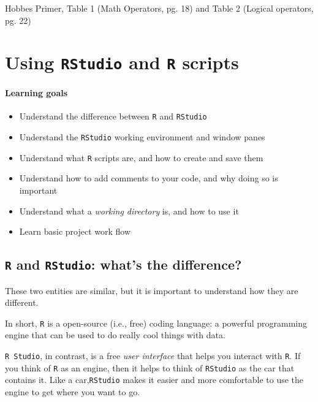 \documentclass[
]{book}
\providecommand{\tightlist}{%
  \setlength{\itemsep}{0pt}\setlength{\parskip}{0pt}}
\begin{document}
Hobbes Primer, Table 1 (Math Operators, pg. 18) and Table 2 (Logical operators, pg. 22)

\hypertarget{using-rstudio-and-r-scripts}{%
\chapter{\texorpdfstring{Using \texttt{RStudio} and \texttt{R} scripts}{Using RStudio and R scripts}}\label{using-rstudio-and-r-scripts}}

\hypertarget{learning-goals-1}{%
\subsubsection*{Learning goals}\label{learning-goals-1}}

\begin{itemize}
\tightlist
\item
  Understand the difference between \texttt{R} and \texttt{RStudio}
\item
  Understand the \texttt{RStudio} working environment and window panes\\
\item
  Understand what \texttt{R} scripts are, and how to create and save them
\item
  Understand how to add comments to your code, and why doing so is important
\item
  Understand what a \emph{working directory} is, and how to use it
\item
  Learn basic project work flow
\end{itemize}

\hypertarget{r-and-rstudio-whats-the-difference}{%
\section*{\texorpdfstring{\texttt{R} and \texttt{RStudio}: what's the difference?}{R and RStudio: what's the difference?}}\label{r-and-rstudio-whats-the-difference}}

These two entities are similar, but it is important to understand how they are different.

In short, \texttt{R} is a open-source (i.e., free) coding language: a powerful programming engine that can be used to do really cool things with data.

\texttt{R\ Studio}, in contrast, is a free \emph{user interface} that helps you interact with \texttt{R}. If you think of \texttt{R} as an engine, then it helps to think of \texttt{RStudio} as the car that contains it. Like a car,\texttt{RStudio} makes it easier and more comfortable to use the engine to get where you want to go.
\end{document}
